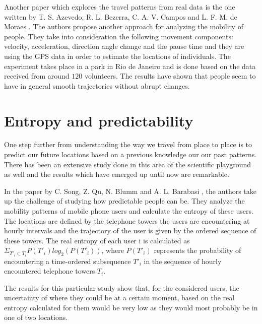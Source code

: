 Another paper which explores the travel patterns from real data is the one
written by T. S. Azevedo, R. L. Bezerra, C. A. V. Campos and L. F. M. de Moraes
\cite{Azevedo09}. The authors propose another approach for analyzing the mobility
of people. They take into consideration the following movement components:
velocity, acceleration, direction angle change and the pause time and they are
using the GPS data in order to estimate the locations of individuals. The
experiment takes place in a park in Rio de Janeiro and is done based on the data
received from around $120$ volunteers. The results have shown that people seem
to have in general smooth trajectories without abrupt changes.

\section{Entropy and predictability}
One step further from understanding the way we travel from place to place is to
predict our future locations based on a previous knowledge our our past
patterns. There has been an extensive study done in this area of the scientific
playground as well and the results which have emerged up until now are
remarkable.

In the paper by C. Song, Z. Qu, N. Blumm and A. L. Barabasi \cite{Barabasi10},
the authors take up the challenge of studying how predictable people can be.
They analyze the mobility patterns of mobile phone users and calculate the
entropy of these users. The locations are defined by the telephone towers the
users are encountering at hourly intervals and the trajectory of the user is
given by the ordered sequence of these towers. The real entropy of each user i
is calculated as $\Sigma _{T'_{i}\subset T_{i}} P(T'_{i})log_{2}(P(T'_{i}))$,
where $P(T'_{i})$ represents the probability of encountering a time-ordered
subsequence $T'_{i}$ in the sequence of hourly encountered telephone towers
$T_{i}$.

The results for this particular study show that, for the considered users, the
uncertainty of where they could be at a certain moment, based on the real
entropy calculated for them would be very low as they would most probably be in
one of two locations.

